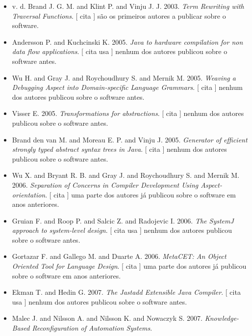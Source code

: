 \begin{itemize}
\item v. d. Brand J. G. M. and Klint P. and Vinju J. J.
      2003.
        \textit{ Term Rewriting with Traversal Functions}.
      [
          cita
      ]
são os primeiros autores a publicar sobre o software.
\item Andersson P. and Kuchcinski K.
      2005.
        \textit{ Java to hardware compilation for non data flow applications}.
      [
          cita
          usa
      ]
nenhum dos autores publicou sobre o software antes.
\item Wu H. and Gray J. and Roychoudhury S. and Mernik M.
      2005.
        \textit{ Weaving a Debugging Aspect into Domain-specific Language Grammars}.
      [
          cita
      ]
nenhum dos autores publicou sobre o software antes.
\item Visser E.
      2005.
        \textit{ Transformations for abstractions}.
      [
          cita
      ]
nenhum dos autores publicou sobre o software antes.
\item Brand den van M. and Moreau E. P. and Vinju J.
      2005.
        \textit{ Generator of efficient strongly typed abstract syntax trees in Java}.
      [
          cita
      ]
nenhum dos autores publicou sobre o software antes.
\item Wu X. and Bryant R. B. and Gray J. and Roychoudhury S. and Mernik M.
      2006.
        \textit{ Separation of Concerns in Compiler Development Using Aspect-orientation}.
      [
          cita
      ]
uma parte dos autores já publicou sobre o software em anos anteriores.
\item Gruian F. and Roop P. and Salcic Z. and Radojevic I.
      2006.
        \textit{ The SystemJ approach to system-level design}.
      [
          cita
          usa
      ]
nenhum dos autores publicou sobre o software antes.
\item Gortazar F. and Gallego M. and Duarte A.
      2006.
        \textit{ MetaCET: An Object Oriented Tool for Language Design}.
      [
          cita
      ]
uma parte dos autores já publicou sobre o software em anos anteriores.
\item Ekman T. and Hedin G.
      2007.
        \textit{ The Jastadd Extensible Java Compiler}.
      [
          cita
          usa
      ]
nenhum dos autores publicou sobre o software antes.
\item Malec J. and Nilsson A. and Nilsson K. and Nowaczyk S.
      2007.
        \textit{ Knowledge-Based Reconfiguration of Automation Systems}.

\end{itemize}

